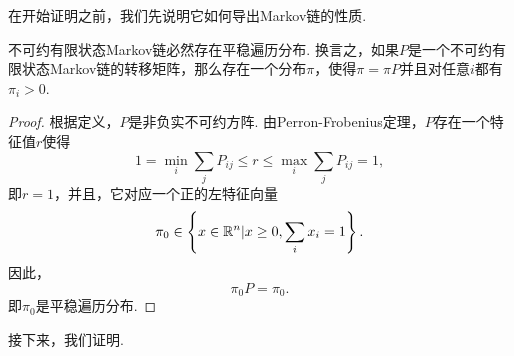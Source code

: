 在开始证明之前，我们先说明它如何导出Markov链的性质. 

\begin{corollary}
    不可约有限状态Markov链必然存在平稳遍历分布. 换言之，如果$P$是一个不可约有限状态Markov链的转移矩阵，那么存在一个分布$\pi$，使得$\pi=\pi P$并且对任意$i$都有$\pi_{i}>0$.
\end{corollary}
\begin{proof}
    根据定义，$P$是非负实不可约方阵. 由Perron-Frobenius定理，$P$存在一个特征值$r$使得
    \[1=\min_i\sum_jP_{ij}\leq r\le\max_i\sum_j P_{ij}=1,\]
    即$r=1$，并且，它对应一个正的左特征向量
    \[\pi_0\in \left\{x\in\mathbb{R}^n|x\geq 0,\sum_ix_i=1\right\}.\]
    因此，
    \[\pi_0 P = \pi_0.\]
    即$\pi_0$是平稳遍历分布. 
\end{proof}

接下来，我们证明.
